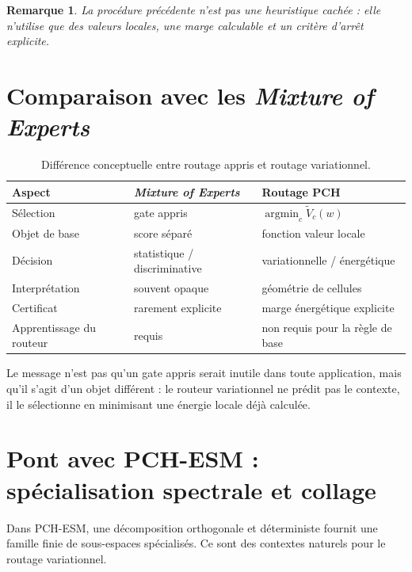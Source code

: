 \documentclass[11pt,a4paper]{article}
\newtheorem{remark}{Remarque}[section]
\DeclareMathOperator{\argmin}{argmin}
\begin{document}
\begin{remark}
La procédure précédente n'est pas une heuristique cachée : elle n'utilise que des valeurs locales, une marge calculable et un critère d'arrêt explicite.
\end{remark}

\section{Comparaison avec les \emph{Mixture of Experts}}

\begin{table}[ht]
\centering
\begin{tabular}{@{}lll@{}}
\toprule
Aspect & \emph{Mixture of Experts} & Routage PCH \\
\midrule
Sélection & gate appris & \(\argmin_c \widetilde V_c(w)\) \\
Objet de base & score séparé & fonction valeur locale \\
Décision & statistique / discriminative & variationnelle / énergétique \\
Interprétation & souvent opaque & géométrie de cellules \\
Certificat & rarement explicite & marge énergétique explicite \\
Apprentissage du routeur & requis & non requis pour la règle de base \\
\bottomrule
\end{tabular}
\caption{Différence conceptuelle entre routage appris et routage variationnel.}
\end{table}

Le message n'est pas qu'un gate appris serait inutile dans toute application, mais qu'il s'agit d'un objet différent : le routeur variationnel ne prédit pas le contexte, il le sélectionne en minimisant une énergie locale déjà calculée.

\section{Pont avec PCH-ESM : spécialisation spectrale et collage}

Dans PCH-ESM, une décomposition orthogonale et déterministe fournit une famille finie de sous-espaces spécialisés. Ce sont des contextes naturels pour le routage variationnel.
\end{document}
